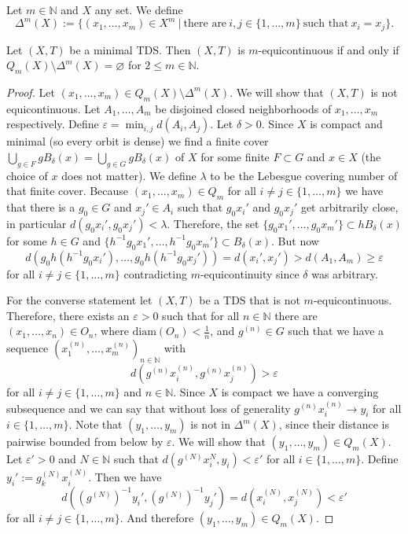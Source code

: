 \begin{definition}
Let $m \in \mathbb{N}$ and $X$ any set.
	We define
	\begin{equation*}
	\Delta^m(X) := \{ (x_1, \dots, x_m) \in X^m \ | \ \text{there are} \ i, j \in \{1, \dots, m\} \ \text{such that} \ x_i = x_j \}.
	\end{equation*}
\end{definition}

\begin{theorem}
	\label{thm:m-equiRelationChar}
	Let $(X, T)$ be a minimal TDS.
	Then $(X, T)$ is $m$-equicontinuous if and only if $Q_m(X) \setminus \Delta^m(X) = \varnothing$ for $2 \leq m \in \mathbb{N}$.
\end{theorem}
\begin{proof}
	Let $(x_1, \dots, x_m) \in Q_m(X) \setminus \Delta^m(X)$.
	We will show that $(X, T)$ is not equicontinuous.
	Let $A_1, \dots, A_m$ be disjoined closed neighborhoods of $x_1, \dots, x_m$ respectively.
	Define $\varepsilon = \min_{i, j} d(A_i, A_j)$.
	Let $\delta > 0$.
	Since $X$ is compact and minimal (so every orbit is dense) we find a finite cover $\bigcup_{g \in F} gB_\delta(x) = \bigcup_{g \in G} gB_\delta(x)$ of $X$ for some finite $F \subset G$ and $x \in X$ (the choice of $x$ does not matter).
	We define $\lambda$ to be the Lebesgue covering number of that finite cover.
	Because $(x_1, \dots, x_m) \in Q_m$ for all $i \neq j \in \{1, \dots, m\}$ we have that there is a $g_0 \in G$ and $x_j' \in A_i$ such that $g_0x_i'$ and $g_0 x_j'$ get arbitrarily close, in particular $d(g_0 x_i', g_0 x_j') < \lambda$.
	Therefore, the set $\{ g_0x_1', \dots, g_0x_m' \} \subset hB_\delta(x)$ for some $h \in G$ and $\{ h^{-1}g_0x_1', \dots, h^{-1}g_0x_m' \} \subset B_\delta(x)$.
	But now
	\[ d(g_0h(h^{-1}g_0x_i'), \dots, g_0h(h^{-1}g_0x_j')) = d(x_i', x_j') > d(A_1, A_m) \geq \varepsilon \]
	for all $i \neq j \in \{1, \dots, m\}$ contradicting $m$-equicontinuity since $\delta$ was arbitrary.

	For the converse statement let $(X, T)$ be a TDS that is not $m$-equicontinuous.
	Therefore, there exists an $\varepsilon > 0$ such that for all $n \in \mathbb{N}$ there are $(x_1, \dots, x_n) \in O_{n}$,
	where $\text{diam}(O_n) < \frac{1}{n}$, and $g^{(n)} \in G$ such that
	we have a sequence $(x_1^{(n)}, \dots, x_m^{(n)})_{n \in \mathbb{N}}$ with
	\[ d(g^{(n)}x_i^{(n)}, g^{(n)}x_j^{(n)}) > \varepsilon \]
 	for all $i \neq j \in \{1, \dots, m\}$ and $n \in \mathbb{N}$.
	Since $X$ is compact we have a converging subsequence and we can say that without loss of generality $g^{(n)}x_i^{(n)} \to y_i$ for all $i \in \{1, \dots, m\}$.
	Note that $(y_1, \dots, y_m)$ is not in $\Delta^m(X)$, since their distance is pairwise bounded from below by $\varepsilon$.
	We will show that $(y_1, \dots, y_m) \in Q_m(X)$.
	Let $\varepsilon' > 0$ and $N \in \mathbb{N}$ such that $d(g^{(N)}x_i^{N}, y_i) < \varepsilon'$ for all $i \in \{1, \dots, m\}$.
	Define $y_i' := g_k^{(N)} x_i^{(N)}$.
	Then we have
	\[ d((g^{(N)})^{-1} y_i', (g^{(N)})^{-1} y_j') = d(x_i^{(N)}, x_j^{(N)}) < \varepsilon' \]
	for all $i \neq j \in \{1, \dots, m\}$.
	And therefore $(y_1, \dots, y_m) \in Q_m(X)$.
 \end{proof}
